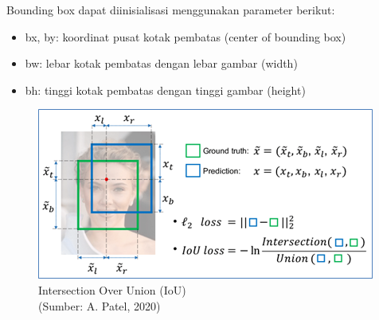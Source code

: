 Bounding box dapat diinisialisasi menggunakan parameter berikut: 
\begin{itemize}
	\item bx, by: koordinat pusat kotak pembatas (center of bounding box)
	\item bw: lebar kotak pembatas dengan lebar gambar (width)
	\item bh: tinggi kotak pembatas dengan tinggi gambar (height)
\end{itemize}

\begin{figure}[H]
	\vspace{-0.1cm}
	\begin{center}
		\includegraphics[width=1\columnwidth]{bab2/Gambar/Picture6.png}
	\end{center}
	\vspace{-0.2cm}
	\caption{Intersection Over Union (IoU)\\(Sumber: A. Patel, 2020)}\label{img:Intersection-Over-Union}
\end{figure}

